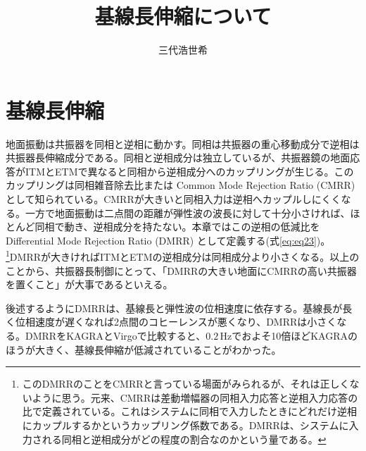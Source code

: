 \documentclass[a4paper,12pt]{jsarticle}
\title{基線長伸縮について}
\author{三代浩世希}
\begin{document}
\setcounter{tocdepth}{2}
\maketitle
{}
\tableofcontents

\section{基線長伸縮}
地面振動は共振器を同相と逆相に動かす。同相は共振器の重心移動成分で逆相は共振器長伸縮成分である。同相と逆相成分は独立しているが、共振器鏡の地面応答がITMとETMで異なると同相から逆相成分へのカップリングが生じる。このカップリングは同相雑音除去比または Common Mode Rejection Ratio (CMRR) として知られている。CMRRが大きいと同相入力は逆相へカップルしにくくなる。一方で地面振動は二点間の距離が弾性波の波長に対して十分小さければ、ほとんど同相で動き、逆相成分を持たない。本章ではこの逆相の低減比をDifferential Mode Rejection Ratio (DMRR) として定義する(式\ref{eq:eq23})。\footnote[3]{このDMRRのことをCMRRと言っている場面がみられるが、それは正しくないように思う。元来、CMRRは差動増幅器の同相入力応答と逆相入力応答の比で定義されている。これはシステムに同相で入力したときにどれだけ逆相にカップルするかというカップリング係数である。DMRRは、システムに入力される同相と逆相成分がどの程度の割合なのかという量である。}DMRRが大きければITMとETMの逆相成分は同相成分より小さくなる。以上のことから、共振器長制御にとって、「DMRRの大きい地面にCMRRの高い共振器を置くこと」が大事であるといえる。

後述するようにDMRRは、基線長と弾性波の位相速度に依存する。基線長が長く位相速度が遅くなれば2点間のコヒーレンスが悪くなり、DMRRは小さくなる。DMRRをKAGRAとVirgoで比較すると、$0.2\, \mathrm{Hz}$でおよそ10倍ほどKAGRAのほうが大きく、基線長伸縮が低減されていることがわかった。
\end{document}
